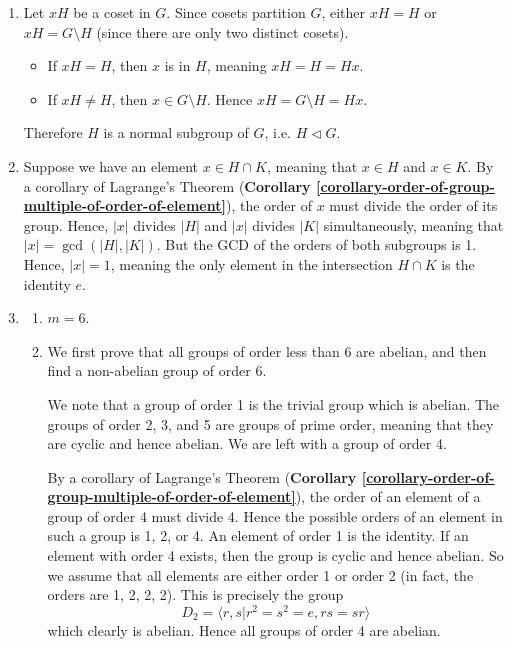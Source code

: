 \begin{enumerate}
    \item Let $xH$ be a coset in $G$. Since cosets partition $G$, either $xH = H$ or $xH = G \setminus H$ (since there are only two distinct cosets).
    \begin{itemize}
            \item If $xH = H$, then $x$ is in $H$, meaning $xH = H = Hx$.
            \item If $xH \neq H$, then $x \in G \setminus H$. Hence $xH = G \setminus H = Hx$.
    \end{itemize}
    Therefore $H$ is a normal subgroup of $G$, i.e. $H \lhd G$.

    \item Suppose we have an element $x \in H \cap K$, meaning that $x \in H$ and $x \in K$. By a corollary of Lagrange's Theorem (\textbf{Corollary \ref{corollary-order-of-group-multiple-of-order-of-element}}), the order of $x$ must divide the order of its group. Hence, $|x|$ divides $|H|$ and $|x|$ divides $|K|$ simultaneously, meaning that $|x| = \gcd(|H|, |K|)$. But the GCD of the orders of both subgroups is 1. Hence, $|x| = 1$, meaning the only element in the intersection $H \cap K$ is the identity $e$.

    \item \begin{enumerate}[label=(\alph*)]
        \item $m = 6$.
        \item We first prove that all groups of order less than 6 are abelian, and then find a non-abelian group of order 6.

        We note that a group of order 1 is the trivial group which is abelian. The groups of order 2, 3, and 5 are groups of prime order, meaning that they are cyclic and hence abelian. We are left with a group of order 4.

        By a corollary of Lagrange's Theorem (\textbf{Corollary \ref{corollary-order-of-group-multiple-of-order-of-element}}), the order of an element of a group of order 4 must divide 4. Hence the possible orders of an element in such a group is 1, 2, or 4. An element of order 1 is the identity. If an element with order 4 exists, then the group is cyclic and hence abelian. So we assume that all elements are either order 1 or order 2 (in fact, the orders are 1, 2, 2, 2). This is precisely the group
        \[
            D_2 = \langle r, s \vert r^2 = s^2 = e, rs = sr\rangle
        \]
        which clearly is abelian. Hence all groups of order 4 are abelian.


\end{enumerate}
\end{enumerate}
